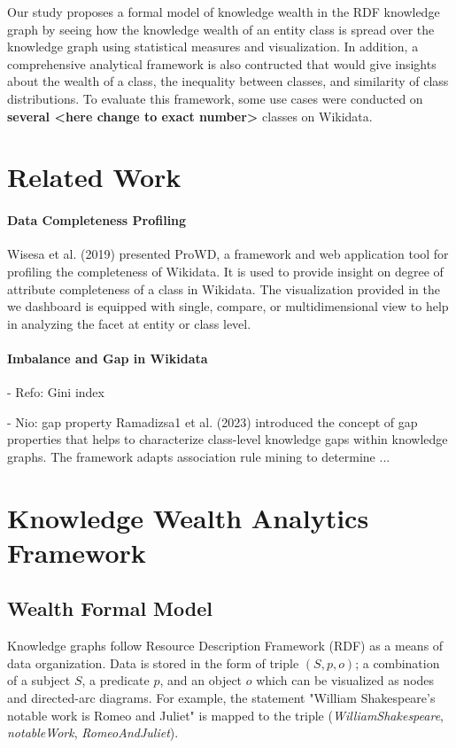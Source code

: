 \documentclass[
]{ceurart}
\begin{document}
Our study proposes a formal model of knowledge wealth in the RDF knowledge graph by seeing how the knowledge wealth of an entity class is spread over the knowledge graph using statistical measures and visualization. In addition, a comprehensive analytical framework is also contructed that would give insights about the wealth of a class, the inequality between classes, and similarity of class distributions. To evaluate this framework, some use cases were conducted on \textbf{several <here change to exact number>} classes on Wikidata.

\section{Related Work}
\paragraph{Data Completeness Profiling} Wisesa et al. (2019) presented ProWD, a framework and web application tool for profiling the completeness of Wikidata. It is used to provide insight on degree of attribute completeness of a class in Wikidata. The visualization provided in the we dashboard is equipped with single, compare, or multidimensional view to help in analyzing the facet at entity or class level.

\paragraph{Imbalance and Gap in Wikidata}
- Refo: Gini index


- Nio: gap property
Ramadizsa1 et al. (2023) introduced the concept of gap properties that helps to characterize class-level knowledge gaps within knowledge graphs. The framework adapts association rule mining to determine ...


\section{Knowledge Wealth Analytics Framework}

\subsection{Wealth Formal Model}
Knowledge graphs follow Resource Description Framework (RDF) as a means of data organization. Data is stored in the form of triple \((S, p, o)\); a combination of a subject \(S\), a predicate \(p\), and an object \(o\) which can be visualized as nodes and directed-arc diagrams. For example, the statement "William Shakespeare's notable work is Romeo and Juliet" is mapped to the triple (\textit{WilliamShakespeare}, \textit{notableWork}, \textit{RomeoAndJuliet}).
\end{document}
